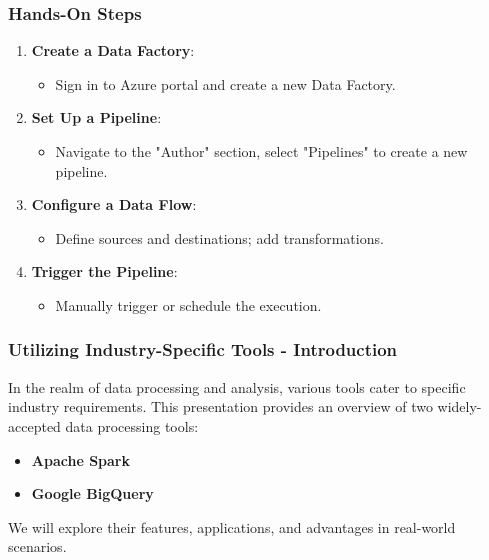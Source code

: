 \documentclass[aspectratio=169]{beamer}
\begin{document}
\begin{frame}[fragile]
    \frametitle{Hands-On Steps}

    \begin{enumerate}
        \item \textbf{Create a Data Factory}:
            \begin{itemize}
                \item Sign in to Azure portal and create a new Data Factory.
            \end{itemize}

        \item \textbf{Set Up a Pipeline}:
            \begin{itemize}
                \item Navigate to the "Author" section, select "Pipelines" to create a new pipeline.
            \end{itemize}

        \item \textbf{Configure a Data Flow}:
            \begin{itemize}
                \item Define sources and destinations; add transformations.
            \end{itemize}
        
        \item \textbf{Trigger the Pipeline}:
            \begin{itemize}
                \item Manually trigger or schedule the execution.
            \end{itemize}
    \end{enumerate}
\end{frame}

\begin{frame}[fragile]
    \frametitle{Utilizing Industry-Specific Tools - Introduction}
    In the realm of data processing and analysis, various tools cater to specific industry requirements. 
    This presentation provides an overview of two widely-accepted data processing tools:
    \begin{itemize}
        \item \textbf{Apache Spark}
        \item \textbf{Google BigQuery}
    \end{itemize}
    We will explore their features, applications, and advantages in real-world scenarios.
\end{frame}
\end{document}
